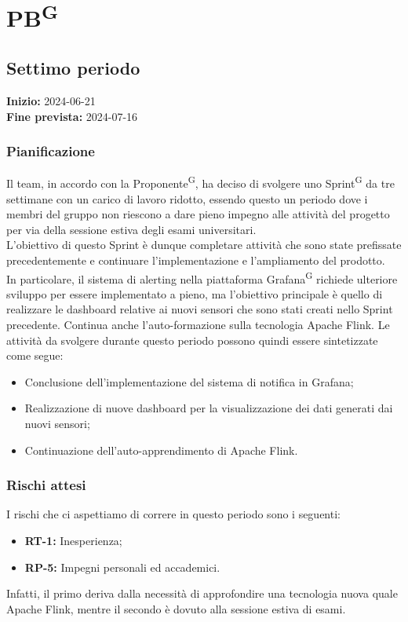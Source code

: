 \documentclass[8pt]{article}
\newcommand{\glossterm}[1]{#1\textsuperscript{G}} %
\begin{document}
\newpage
\section{\glossterm{PB}}
\subsection{Settimo periodo}
\textbf{Inizio:} 2024-06-21\\
\textbf{Fine prevista:} 2024-07-16
\subsubsection{Pianificazione}
Il team, in accordo con la \glossterm{Proponente}, ha deciso di svolgere uno \glossterm{Sprint} da tre settimane con un carico di lavoro ridotto, essendo questo un periodo dove i membri del gruppo non riescono a dare pieno impegno alle attività del progetto per via della sessione estiva degli esami universitari. \\
L'obiettivo di questo Sprint è dunque completare attività che sono state prefissate precedentemente e continuare l'implementazione e l'ampliamento del prodotto. \\
In particolare, il sistema di alerting nella piattaforma \glossterm{Grafana} richiede ulteriore sviluppo per essere implementato a pieno, ma l'obiettivo principale è quello di realizzare le dashboard relative ai nuovi sensori che sono stati creati nello Sprint precedente. Continua anche l'auto-formazione sulla tecnologia Apache Flink. Le attività da svolgere durante questo periodo possono quindi essere sintetizzate come segue:
\begin{itemize}
    \setlength{\itemsep}{0em}
    \item Conclusione dell'implementazione del sistema di notifica in Grafana;
    \item Realizzazione di nuove dashboard per la visualizzazione dei dati generati dai nuovi sensori;
    \item Continuazione dell'auto-apprendimento di Apache Flink.
\end{itemize}
\subsubsection{Rischi attesi}
I rischi che ci aspettiamo di correre in questo periodo sono i seguenti:
\begin{itemize}
    \item \textbf{RT-1:} Inesperienza;
    \item \textbf{RP-5:} Impegni personali ed accademici.
\end{itemize}
Infatti, il primo deriva dalla necessità di approfondire una tecnologia nuova quale Apache Flink, mentre il secondo è dovuto alla sessione estiva di esami.
\newpage
\end{document}
